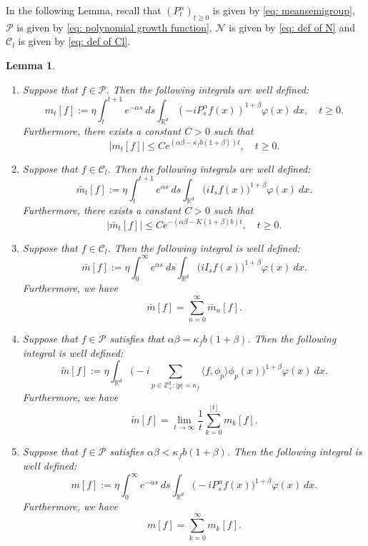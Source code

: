 \documentclass[12pt,a4paper]{amsart}
\theoremstyle{plain}
\newtheorem{lem}[thm]{Lemma}
\theoremstyle{definition}
\numberwithin{equation}{section}
\begin{document}
    In the following Lemma, recall that $(P^\alpha_t)_{t\geq 0}$ is given by \eqref{eq: meansemigroup}, $\mathcal P$ is given by \eqref{eq: polynomial growth function}, $\mathcal N$ is given by \eqref{eq: def of N} and $\mathcal C_l$ is given by \eqref{eq: def of Cl}.
\begin{lem}
\label{lem: def of all m} 
\begin{enumerate}
\item 
	Suppose that $f\in\mathcal{P}$. Then the following integrals are well defined:
\[
	m_t[f]
    := \eta \int_t^{t+1}e^{-\alpha s}~ds\int_{\mathbb R^d} (-iP_{s}^\alpha f(x))^{1+\beta} \varphi(x)~dx, 
    \quad t\geq 0.
\]
	Furthermore, there exists a constant $C>0$ such that
\begin{equation}\label{domi-m}
    |m_t[f]|
    \leq C e^{(\alpha\beta-\kappa_fb(1+\beta))t},
    \quad t\geq 0.
\end{equation}
\item 
    Suppose that $f\in\mathcal C_l$. Then the following integrals are well defined:
\[
    \bar{m}_t[f]
    := \eta \int_{t}^{t+1} e^{\alpha s}~ds \int_{\mathbb R^d}\big(iI_sf(x)\big)^{1+\beta} \varphi(x)~dx.
\]
    Furthermore, there exists a constant $C>0$ such that
\begin{equation}
    |\bar{m}_t[f]| \leq C e^{-(\alpha\beta-K(1+\beta)b)t}, \quad t\geq 0.
\end{equation}
\item
    Suppose that $f \in \mathcal C_l$. 
    Then the following integral is well defined:
\[
    \bar{m}[f]
   :=\eta \int_{0}^{\infty} e^{\alpha s}~ds \int_{\mathbb R^d} \big(iI_sf(x)\big)^{1+\beta}\varphi(x)~dx.
\]
    Furthermore, we have
\[
    \bar{m}[f]
    =\sum_{n=0}^{\infty}\bar{m}_n[f].
\]
\item
	Suppose that $f \in \mathcal{P}$ satisfies that $\alpha\beta=\kappa_f b(1+\beta)$. Then the following integral is well defined:
\[
	\tilde{m}[f]
    := \eta\int_{\mathbb R^d} \Big(-i\sum_{p\in \mathbb Z_+^d:|p|=\kappa_f}\langle f,\phi_p\rangle\phi_p(x)\Big)^{1+\beta} \varphi(x)~dx.
\]
	Furthermore, we have
\[
	\widetilde{m}[f] = \lim_{t\rightarrow \infty}\frac{1}{t}\sum_{k=0}^{\lfloor t \rfloor}m_k[f].
\]
\item
	Suppose that $f\in \mathcal{P}$ satisfies $\alpha\beta<\kappa_fb(1+\beta)$. 
	Then the following integral is well defined:
\[
    m[f]
    :=\eta \int_0^{\infty} e^{-\alpha s} ~ds\int_{\mathbb R^d} \big(-iP_s^\alpha f(x)\big)^{1+\beta} \varphi(x)~dx.
\]
	Furthermore, we have
\[    
	m[f]
    =\sum_{k=0}^\infty m_k[f].
\]
\end{enumerate}
\end{lem}
\end{document}
